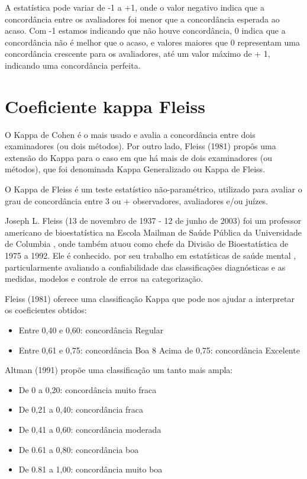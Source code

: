 \documentclass[
  letterpaper,
  DIV=11,
  numbers=noendperiod]{scrreprt}
\providecommand{\tightlist}{%
  \setlength{\itemsep}{0pt}\setlength{\parskip}{0pt}}\usepackage{longtable,booktabs,array}
\begin{document}
A estatística pode variar de -1 a +1, onde o valor negativo indica que a
concordância entre os avaliadores foi menor que a concordância esperada
ao acaso. Com -1 estamos indicando que não houve concordância, 0 indica
que a concordância não é melhor que o acaso, e valores maiores que 0
representam uma concordância crescente para os avaliadores, até um valor
máximo de + 1, indicando uma concordância perfeita.

\hypertarget{coeficiente-kappa-fleiss}{%
\section{Coeficiente kappa Fleiss}\label{coeficiente-kappa-fleiss}}

O Kappa de Cohen é o mais usado e avalia a concordância entre dois
examinadores (ou dois métodos). Por outro lado, Fleiss (1981) propôs uma
extensão do Kappa para o caso em que há mais de dois examinadores (ou
métodos), que foi denominada Kappa Generalizado ou Kappa de Fleiss.

O Kappa de Fleiss é um teste estatístico não-paramétrico, utilizado para
avaliar o grau de concordância entre 3 ou + observadores, avaliadores
e/ou juízes.

Joseph L. Fleiss (13 de novembro de 1937 - 12 de junho de 2003) foi um
professor americano de bioestatística na Escola Mailman de Saúde Pública
da Universidade de Columbia , onde também atuou como chefe da Divisão de
Bioestatística de 1975 a 1992. Ele é conhecido. por seu trabalho em
estatísticas de saúde mental , particularmente avaliando a
confiabilidade das classificações diagnósticas e as medidas, modelos e
controle de erros na categorização.

Fleiss (1981) oferece uma classificação Kappa que pode nos ajudar a
interpretar os coeficientes obtidos:

\begin{itemize}
\tightlist
\item
  Entre 0,40 e 0,60: concordância Regular
\item
  Entre 0,61 e 0,75: concordância Boa 8 Acima de 0,75: concordância
  Excelente
\end{itemize}

Altman (1991) propõe uma classificação um tanto mais ampla:

\begin{itemize}
\tightlist
\item
  De 0 a 0,20: concordância muito fraca
\item
  De 0,21 a 0,40: concordância fraca
\item
  De 0,41 a 0,60: concordância moderada
\item
  De 0.61 a 0,80: concordância boa
\item
  De 0.81 a 1,00: concordância muito boa
\end{itemize}
\end{document}
